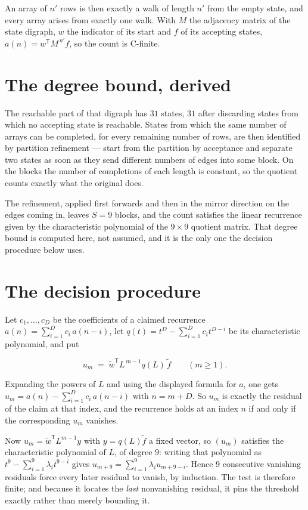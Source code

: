 \documentclass[11pt]{article}
\theoremstyle{definition}
\begin{document}
An array of $n'$ rows is then exactly a walk of length $n'$ from the empty state, and every array arises from exactly one walk. With $M$ the adjacency matrix of the state digraph, $w$ the indicator of its start and $f$ of its accepting states, $a(n) = w^{\mathsf T}M^{\,n'}f$, so the count is C-finite.

\section{The degree bound, derived}

The reachable part of that digraph has $31$ states, $31$ after discarding states from which no accepting state is reachable. States from which the same number of arrays can be completed, for every remaining number of rows, are then identified by partition refinement --- start from the partition by acceptance and separate two states as soon as they send different numbers of edges into some block. On the blocks the number of completions of each length is constant, so the quotient counts exactly what the original does.

The refinement, applied first forwards and then in the mirror direction on the edges coming in, leaves $S = 9$ blocks, and the count satisfies the linear recurrence given by the characteristic polynomial of the $9 \times 9$ quotient matrix. That degree bound is computed here, not assumed, and it is the only one the decision procedure below uses.

\section{The decision procedure}

Let $c_1,\dots,c_D$ be the coefficients of a claimed recurrence $a(n) = \sum_{i=1}^{D} c_i\,a(n-i)$, let $q(t) = t^{D} - \sum_{i=1}^{D} c_i t^{D-i}$ be its characteristic polynomial, and put

\[u_m \;=\; \tilde w^{\mathsf T} L^{\,m-1} q(L)\,\tilde f \qquad (m \ge 1).\]

Expanding the powers of $L$ and using the displayed formula for $a$, one gets $u_m = a(n) - \sum_{i=1}^{D} c_i\,a(n-i)$ with $n = m + D$. So $u_m$ is exactly the residual of the claim at that index, and the recurrence holds at an index $n$ if and only if the corresponding $u_m$ vanishes.

Now $u_m = \tilde w^{\mathsf T} L^{m-1} y$ with $y = q(L)\tilde f$ a fixed vector, so $(u_m)$ satisfies the characteristic polynomial of $L$, of degree $9$: writing that polynomial as $t^{9} - \sum_{i=1}^{9} \lambda_i t^{9-i}$ gives $u_{m+9} = \sum_{i=1}^{9} \lambda_i u_{m+9-i}$. Hence $9$ consecutive vanishing residuals force every later residual to vanish, by induction. The test is therefore finite; and because it locates the {\itshape last} nonvanishing residual, it pins the threshold exactly rather than merely bounding it.
\end{document}
